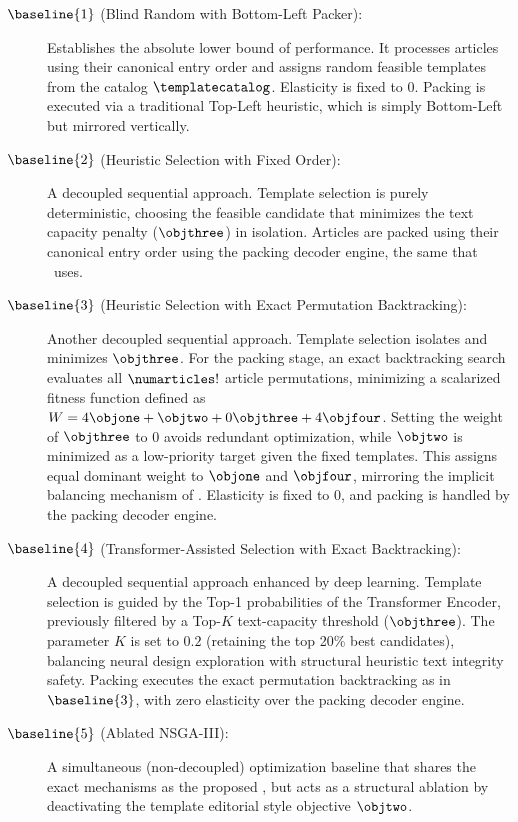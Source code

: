 \begin{description}
    \item[$\baseline{1}$ (Blind Random with Bottom-Left Packer):] Establishes the absolute lower bound of performance. It processes articles using their canonical entry order and assigns random feasible templates from the catalog $\templatecatalog$. Elasticity is fixed to 0. Packing is executed via a traditional Top-Left heuristic, which is simply Bottom-Left~\cite{chazelle-bl} but mirrored vertically.
    
    \item[$\baseline{2}$ (Heuristic Selection with Fixed Order):] A decoupled sequential approach. Template selection is purely deterministic, choosing the feasible candidate that minimizes the text capacity penalty ($\objthree$) in isolation. Articles are packed using their canonical entry order  using the packing decoder engine, the same that \methodNameUniform\ uses.
    
    \item[$\baseline{3}$ (Heuristic Selection with Exact Permutation Backtracking):] Another decoupled sequential approach. Template selection isolates and minimizes $\objthree$. For the packing stage, an exact backtracking search evaluates all $\numarticles!$ article permutations, minimizing a scalarized fitness function defined as $W = 4\objone + \objtwo + 0\objthree + 4\objfour$. Setting the weight of $\objthree$ to 0 avoids redundant optimization, while $\objtwo$ is minimized as a low-priority target given the fixed templates. This assigns equal dominant weight to $\objone$ and $\objfour$, mirroring the implicit balancing mechanism of \methodNameUniform. Elasticity is fixed to 0, and packing is handled by the packing decoder engine.
    
    \item[$\baseline{4}$ (Transformer-Assisted Selection with Exact Backtracking):] A decoupled sequential approach enhanced by deep learning. Template selection is guided by the Top-1 probabilities of the Transformer Encoder, previously filtered by a Top-$K$ text-capacity threshold ($\objthree$). The parameter $K$ is set to $0.2$ (retaining the top 20\% best candidates), balancing neural design exploration with structural heuristic text integrity safety. Packing executes the exact permutation backtracking as in $\baseline{3}$, with zero elasticity over the packing decoder engine.
    
    \item[$\baseline{5}$ (Ablated NSGA-III):] A simultaneous (non-decoupled) optimization baseline that shares the exact mechanisms as the proposed \methodNameUniform, but acts as a structural ablation by deactivating the template editorial style objective $\objtwo$.
\end{description}

